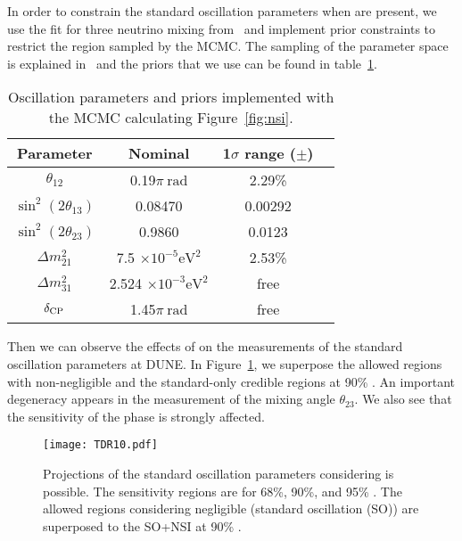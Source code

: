 In order to constrain the standard oscillation parameters when   are %
present, we use the fit for three neutrino mixing from~\cite{Gonzalez-Garcia:2013usa} and implement prior constraints to restrict the region sampled by the MCMC. The sampling of the parameter space is explained in~\cite{Coloma:2015kiu} and the priors that we use can be found in table~\ref{tab:priors1}.
\begin{table}[htb]
\caption{Oscillation parameters and priors implemented with the MCMC calculating Figure~\ref{fig:nsi}.} \label{tab:priors1}
\begin{center}
\begin{tabular}{cccc}
\hline
\hline
Parameter&Nominal&1$\sigma$ range ($\pm$)\\ 
\hline
$\theta_{12}$ &0.19$\pi~\textrm{rad}$&2.29\%\\
$\sin^2(2\theta_{13})$ &0.08470&0.00292\\
$\sin^2(2\theta_{23})$ &0.9860&0.0123\\
$\Delta m^2_{21} $ &7.5 $\times10^{-5}\textrm{eV}^2$&2.53\%\\
$\Delta m^2_{31} $ &2.524 $\times10^{-3}\textrm{eV}^2$&free\\
$\delta_{\rm CP} $ &1.45$\pi~\textrm{rad}$&free\\
\hline 
\hline
\end{tabular}
\end{center}
\end{table}

Then we can observe the effects of   on the measurements of the standard oscillation parameters at DUNE. In Figure~\ref{fig:standar-nsi}, we superpose the allowed regions with non-negligible   and the standard-only credible regions at 90\% . %
An important degeneracy appears in the measurement of the mixing angle $\theta_{23}$. We also see that the sensitivity of the  phase is strongly affected.
\begin{figure}[!htb]
	\centering
    \texttt{[image: TDR10.pdf]}
   \caption[Projections of the standard oscillation parameters considering   is possible]{\label{fig:standar-nsi}Projections of the standard oscillation parameters considering   is possible. The sensitivity regions are for 68\%, 90\%, and 95\% . The allowed regions considering negligible   (standard oscillation (SO)) are superposed to the SO+NSI at 90\% .}
\end{figure}

